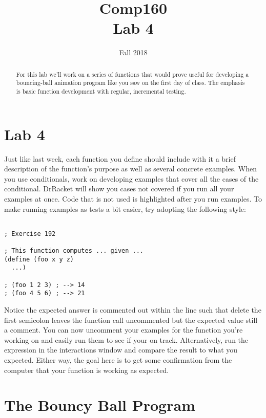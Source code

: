\documentclass[nobib]{tufte-handout}
\title{Comp160 \\ Lab 4 }
\author{}
\date{ Fall 2018 }
\begin{document}
\maketitle

\begin{abstract}
For this lab we'll work on a series of functions that would prove useful for developing a bouncing-ball animation program like you saw on the first day of class.  The emphasis is basic function development with regular, incremental testing.
\end{abstract}

\section*{Lab 4}

Just like last week, each function you define should include with it a brief description of the function's purpose as well as several concrete examples. When you use conditionals, work on developing examples that cover all the cases of the conditional. DrRacket will show you cases not covered if you run all your examples at once. Code that is not used is highlighted after you run examples. To make running examples as tests a bit easier, try adopting the following style:

\begin{lstlisting}

; Exercise 192

; This function computes ... given ...
(define (foo x y z)
  ...)

; (foo 1 2 3) ; --> 14
; (foo 4 5 6) ; --> 21
\end{lstlisting}

Notice the expected answer is commented out within the line such that delete the first semicolon leaves the function call uncommented but the expected value still a comment. You can now uncomment your examples for the function you're working on and easily run them to see if your on track. Alternatively, run the expression in the interactions window and compare the result to what you expected. Either way, the goal here is to get some confirmation from the computer that your function is working as expected.

\section*{The Bouncy Ball Program}
\end{document}
